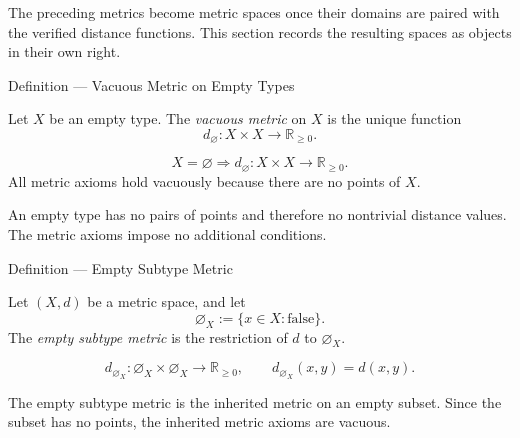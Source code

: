 \begin{remark*}[Exposition]
The preceding metrics become metric spaces once their domains are paired with
the verified distance functions.  This section records the resulting spaces as
objects in their own right.
\end{remark*}

\begin{definitionbox}{Definition --- Vacuous Metric on Empty Types}
\begin{definition}
\label{def:vacuous-metric-empty-types}
Let \(X\) be an empty type.  The \emph{vacuous metric} on \(X\) is the unique
function
\[
  d_{\varnothing}:X\times X\to\mathbb{R}_{\geq 0}.
\]
\end{definition}
\end{definitionbox}

\begin{remark*}
\[
X=\varnothing
\Longrightarrow
d_{\varnothing}:X\times X\to\mathbb{R}_{\geq 0}.
\]
All metric axioms hold vacuously because there are no points of \(X\).
\end{remark*}

\begin{remark*}[Interpretation]
An empty type has no pairs of points and therefore no nontrivial distance
values.  The metric axioms impose no additional conditions.
\end{remark*}


\DefinitionalRoot

\begin{definitionbox}{Definition --- Empty Subtype Metric}
\begin{definition}\label{def:empty-subtype-metric}
Let \((X,d)\) be a metric space, and let
\[
  \varnothing_X:=\{x\in X : \text{false}\}.
\]
The \emph{empty subtype metric} is the restriction of \(d\) to
\(\varnothing_X\).
\end{definition}
\end{definitionbox}

\begin{remark*}
\[
d_{\varnothing_X}:
\varnothing_X\times\varnothing_X\to\mathbb{R}_{\geq 0},
\qquad
d_{\varnothing_X}(x,y)=d(x,y).
\]
\end{remark*}

\begin{remark*}[Interpretation]
The empty subtype metric is the inherited metric on an empty subset.  Since
the subset has no points, the inherited metric axioms are vacuous.
\end{remark*}

